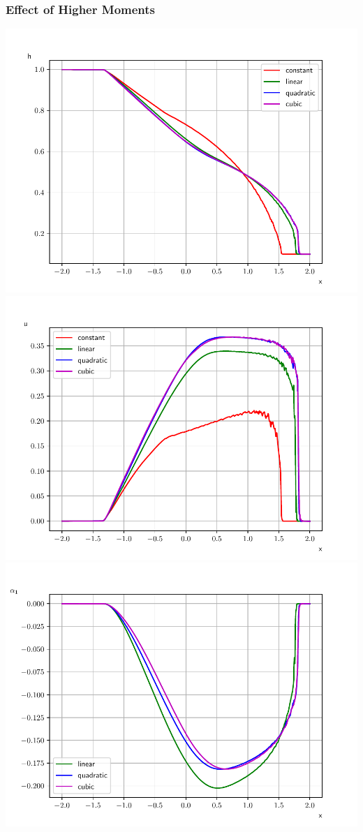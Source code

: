 \documentclass[10pt]{beamer}
\begin{document}
\begin{frame}
  \frametitle{Effect of Higher Moments}
  \centering
  \includegraphics[scale=0.29]{Figures/height_dam.pdf}
  \includegraphics[scale=0.29]{Figures/mean_velocity_dam.pdf}
  \includegraphics[scale=0.29]{Figures/alpha_1_dam.pdf}

\end{frame}
\end{document}
